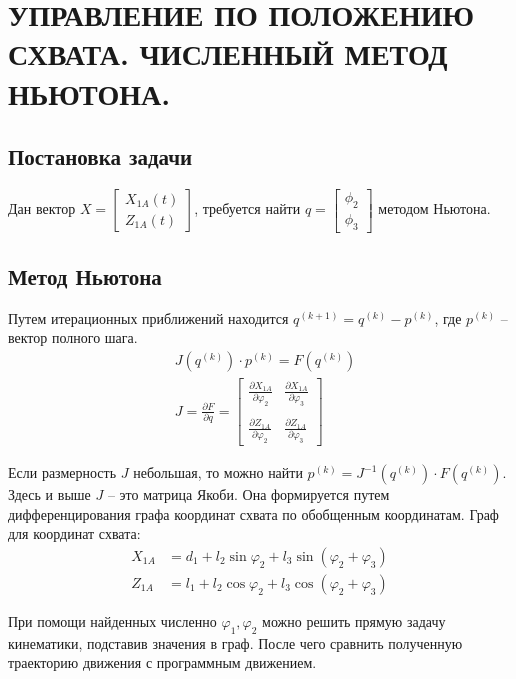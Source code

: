 \chapter{\MakeUppercase{ Управление по положению схвата. Численный метод Ньютона. }}

\section{Постановка задачи}
Дан вектор $ X = \begin{bmatrix}
    X_{1A}(t) \\ Z_{1A}(t)
\end{bmatrix} $, требуется найти $ q = \begin{bmatrix}
    \phi_2 \\ \phi_3
\end{bmatrix} $ методом Ньютона.

\section{Метод Ньютона}
Путем итерационных приближений находится $ q^{(k+1)}=q^{(k)}-p^{(k)} $, где $ p^{(k)} $ -- вектор полного шага.
\begin{align*}
    & J(q^{(k)}) \cdot p^{(k)} = F(q^{(k)}) \\
    & J = \frac{\partial F}{\partial q} = \begin{bmatrix}
        \frac{\partial X_{1A}}{\partial \varphi_2} & \frac{\partial X_{1A}}{\partial \varphi_3} \\ \\
        \frac{\partial Z_{1A}}{\partial \varphi_2} & \frac{\partial Z_{1A}}{\partial \varphi_3}
    \end{bmatrix}
\end{align*}

Если размерность $ J $ небольшая, то можно найти $ p^{(k)} = J^{-1}(q^{(k)}) \cdot F(q^{(k)}) $. Здесь и выше $ J $ -- это матрица Якоби. Она формируется путем дифференцирования графа координат схвата по обобщенным координатам. Граф для координат схвата:
\begin{align*}
    X_{1A}&=d_1+l_2\sin\varphi_2+l_3\sin{(\varphi_2+\varphi_3)} \\
    Z_{1A}&=l_1+l_2\cos\varphi_2+l_3\cos{(\varphi_2+\varphi_3)}
\end{align*}

При помощи найденных численно $ \varphi_1, \varphi_2 $ можно решить прямую задачу кинематики, подставив значения в граф. После чего сравнить полученную траекторию движения с программным движением.